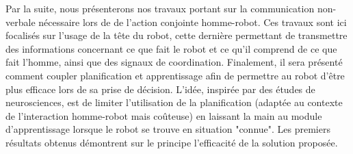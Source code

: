 \documentclass[english,a4paper,11pt,twoside]{StyleThese}
\begin{document}
Par la suite, nous présenterons nos travaux portant sur la communication non-verbale nécessaire lors de de l'action conjointe homme-robot. Ces travaux sont ici focalisés sur l'usage de la tête du robot, cette dernière permettant de transmettre des informations concernant ce que fait le robot et ce qu'il comprend de ce que fait l'homme, ainsi que des signaux de coordination.
Finalement, il sera présenté comment coupler planification et apprentissage afin de permettre au robot d'être plus efficace lors de sa prise de décision. L'idée, inspirée par des études de neurosciences, est de limiter l'utilisation de la planification (adaptée au contexte de l'interaction homme-robot mais coûteuse) en laissant la main au module d'apprentissage lorsque le robot se trouve en situation "connue". Les premiers résultats obtenus démontrent sur le principe l'efficacité de la solution proposée.

\ifdefined{}
\else


\end{document}
